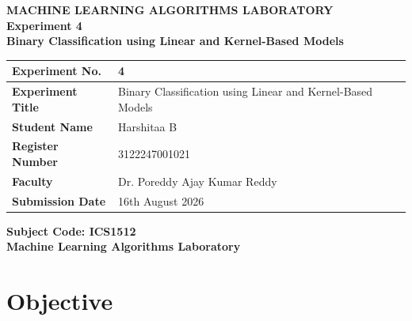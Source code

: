 \documentclass[12pt,a4paper]{article}
\begin{document}

\begin{center}

{\Large \textbf{MACHINE LEARNING ALGORITHMS LABORATORY}}\\[0.3cm]

{\large \textbf{Experiment 4}}\\[0.3cm]

{\Large \textbf{Binary Classification using Linear and Kernel-Based Models}}

\end{center}

\vspace{0.5cm}

\begin{tabular}{|p{4cm}|p{10.5cm}|}
\hline
\textbf{Experiment No.} & 4 \\ \hline

\textbf{Experiment Title} &
Binary Classification using Linear and Kernel-Based Models \\ \hline

\textbf{Student Name} & Harshitaa B\\ \hline

\textbf{Register Number} & 3122247001021 \\ \hline

\textbf{Faculty} & Dr. Poreddy Ajay Kumar Reddy \\ \hline

\textbf{Submission Date} & 16th August 2026 \\ \hline

\end{tabular}

\vspace{0.5cm}

\begin{center}
\textbf{Subject Code: ICS1512}\\
\textbf{Machine Learning Algorithms Laboratory}
\end{center}

\newpage


\section{Objective}
\end{document}

